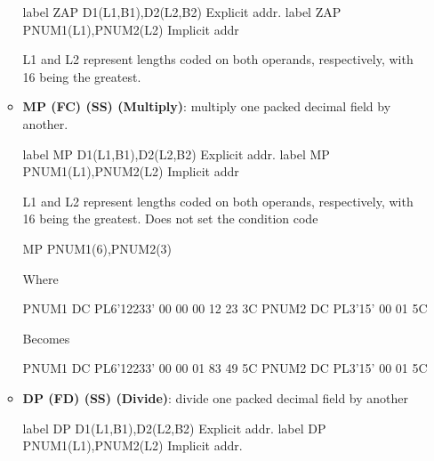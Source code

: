 \documentclass{report}
\begin{document}
\begin{itemize}
\begin{itemize}
                    \bigbreak \noindent 
                    \begin{cppcode}
                        label ZAP D1(L1,B1),D2(L2,B2) Explicit addr.
                        label ZAP PNUM1(L1),PNUM2(L2) Implicit addr
                    \end{cppcode}
                    \bigbreak \noindent 
                    L1 and L2 represent lengths coded on both operands, respectively, with 16 being the greatest.
                \item \textbf{MP (FC) (SS) (Multiply)}: multiply one packed decimal field by another.
                    \bigbreak \noindent 
                    \begin{cppcode}
                        label MP D1(L1,B1),D2(L2,B2) Explicit addr.
                        label MP PNUM1(L1),PNUM2(L2) Implicit addr
                    \end{cppcode}
                    \bigbreak \noindent 
                    L1 and L2 represent lengths coded on both operands, respectively, with 16 being the greatest.
                    \bigbreak \noindent 
                    Does not set the condition code
                    \bigbreak \noindent 
                    \begin{cppcode}
                    MP PNUM1(6),PNUM2(3)
                    \end{cppcode}
                    \bigbreak \noindent 
                    Where
                    \bigbreak \noindent 
                    \begin{cppcode}
                        PNUM1 DC PL6'12233'    00 00 00 12 23 3C
                        PNUM2 DC PL3'15'       00 01 5C
                    \end{cppcode}
                    \bigbreak \noindent 
                    Becomes
                    \bigbreak \noindent 
                    \begin{cppcode}
                        PNUM1 DC PL6'12233'    00 00 01 83 49 5C
                        PNUM2 DC PL3'15'       00 01 5C
                    \end{cppcode}
                \item \textbf{DP (FD) (SS) (Divide)}: divide one packed decimal field by another
                    \bigbreak \noindent 
                    \begin{cppcode}
                        label DP D1(L1,B1),D2(L2,B2) Explicit addr.
                        label DP PNUM1(L1),PNUM2(L2) Implicit addr.
                    \end{cppcode}

\end{itemize}
\end{itemize}
\end{document}
